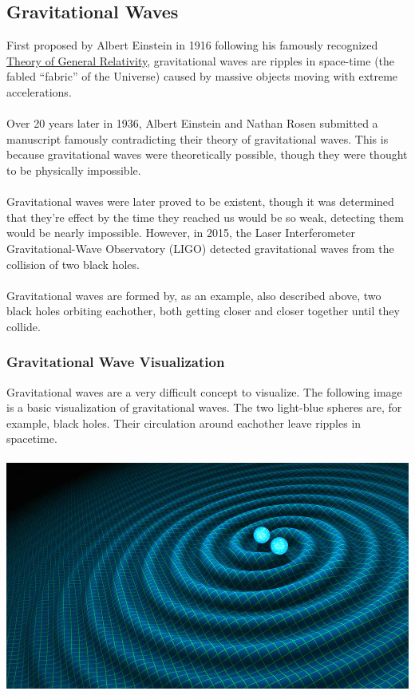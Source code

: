 \documentclass{article}
\begin{document}
\subsection{Gravitational Waves}
First proposed by Albert Einstein in 1916 following his famously recognized \hyperref[sec:generalrelativity]{Theory of General Relativity}, gravitational waves are ripples in space-time (the fabled “fabric” of the Universe) caused by massive objects moving with extreme accelerations.\\\\
Over 20 years later in 1936, Albert Einstein and Nathan Rosen submitted a manuscript famously contradicting their theory of gravitational waves. This is because gravitational waves were theoretically possible, though they were thought to be physically impossible. \\\\
Gravitational waves were later proved to be existent, though it was determined that they're effect by the time they reached us would be so weak, detecting them would be nearly impossible. However, in 2015, the Laser Interferometer Gravitational-Wave Observatory (LIGO) detected gravitational waves from the collision of two black holes.\\\\
Gravitational waves are formed by, as an example, also described above, two black holes orbiting eachother, both getting closer and closer together until they collide.

\subsubsection{Gravitational Wave Visualization}
Gravitational waves are a very difficult concept to visualize. The following image is a basic visualization of gravitational waves. The two light-blue spheres are, for example, black holes. Their circulation around eachother leave ripples in spacetime.\\\\
\includegraphics[scale=0.33]{images/gravitational_waves.png}
\end{document}

